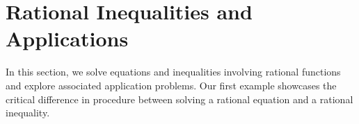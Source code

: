 \section{Rational Inequalities and Applications}

\label{RationalIneq}

In this section, we solve equations and inequalities involving rational functions and explore associated application problems. Our first example showcases the critical difference in procedure between solving a rational equation and a rational inequality.

\medskip

